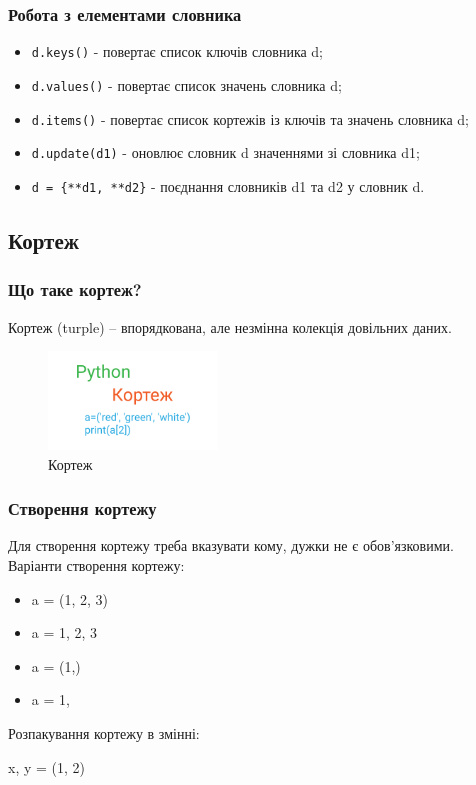 \begin{frame}
\frametitle{Робота з елементами словника}
    \begin{itemize}
        \item<1-> \texttt{d.keys()} - повертає список ключів словника d;
        \item<1-> \texttt{d.values()} - повертає список значень словника d;
        \item<1-> \texttt{d.items()} - повертає список кортежів із ключів та значень словника d;
        \item<2-> \texttt{d.update(d1)} - оновлює словник d значеннями зі словника d1;
        \item<3-> \texttt{d = \{**d1, **d2\}} - поєднання словників d1 та d2 у словник d.
    \end{itemize}
\end{frame}

\subsection{Кортеж} 
\begin{frame}
\frametitle{Що таке кортеж?}
Кортеж (turple) – впорядкована, але незмінна колекція довільних даних.

\begin{figure}
\begin{center}
 \includegraphics[width=0.4\textwidth]{pictures/turple.png}
\caption{Кортеж}
\label{turple} 
\end{center}
\end{figure}

\end{frame}

\begin{frame}
\frametitle{Створення кортежу}
Для створення кортежу треба вказувати кому, дужки не є обов'язковими. Варіанти створення кортежу:

\begin{itemize}
  \item a = (1, 2, 3)
  \item a = 1, 2, 3
  \item a = (1,)
  \item a = 1,
\end{itemize}

Розпакування кортежу в змінні:

x, y = (1, 2)
\end{frame}

